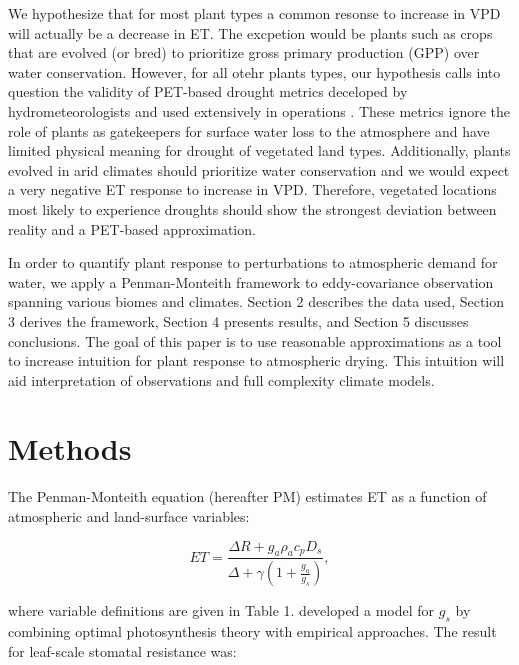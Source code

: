 \documentclass[draft,linenumbers]{agujournal}
\begin{document}
We hypothesize that for most plant types a common resonse to increase in VPD will actually be a decrease in ET. The excpetion would be plants such as crops that are evolved (or bred) to prioritize gross primary production (GPP) over water conservation. However, for all otehr plants types, our hypothesis calls into question the validity of PET-based drought metrics deceloped by hydrometeorologists and used extensively in operations \citep[e.g. PDSI, P-PET,][]{2002, Alley_1984} . These metrics ignore the role of plants as gatekeepers for surface water loss to the atmosphere and have limited physical meaning for drought of vegetated land types. Additionally, plants evolved in arid climates should prioritize water conservation and we would expect a very negative ET response to increase in VPD. Therefore, vegetated locations most likely to experience droughts should show the strongest deviation between reality and a PET-based approximation. 

In order to quantify plant response to perturbations to atmospheric demand for water, we apply a Penman-Monteith framework to eddy-covariance observation spanning various biomes and climates. Section 2 describes the data used, Section 3 derives the framework, Section 4 presents results, and Section 5 discusses conclusions. The goal of this paper is to use reasonable approximations as a tool to increase intuition for plant response to atmospheric drying. This intuition will aid interpretation of observations and full complexity climate models. 

\section{Methods}

The Penman-Monteith equation (hereafter PM) estimates ET as a function of atmospheric and land-surface variables:

\begin{linenomath*}
  \begin{equation}
      ET = \frac{\Delta R + g_a \rho_a c_p D_{s}}{\Delta + \gamma(1 + \frac{g_a}{g_s})},
  \end{equation}
\end{linenomath*}

 where variable definitions are given in Table 1. \citet{MEDLYN_2011} developed a model for $g_s$ by combining optimal photosynthesis theory with empirical approaches. The result for leaf-scale stomatal resistance was:
\end{document}
